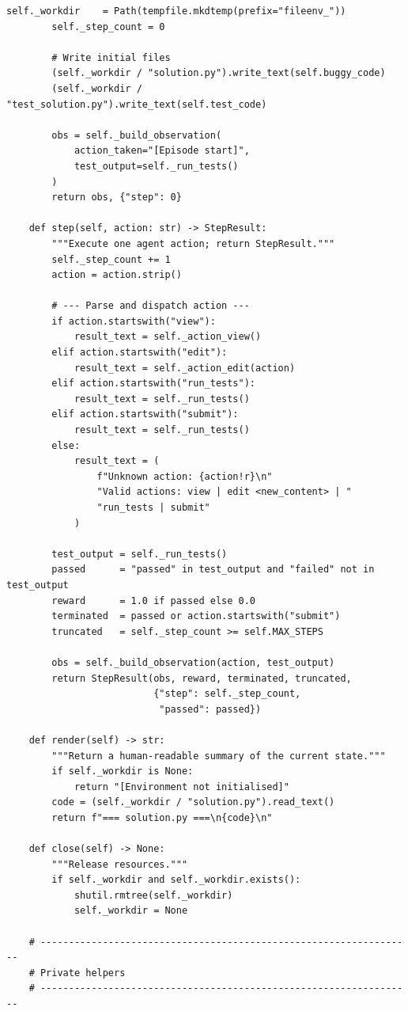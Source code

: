 \begin{lstlisting}[style=pythonstyle, caption={Minimal LLM agent environment following the Gymnasium API.}]
        self._workdir    = Path(tempfile.mkdtemp(prefix="fileenv_"))
        self._step_count = 0

        # Write initial files
        (self._workdir / "solution.py").write_text(self.buggy_code)
        (self._workdir / "test_solution.py").write_text(self.test_code)

        obs = self._build_observation(
            action_taken="[Episode start]",
            test_output=self._run_tests()
        )
        return obs, {"step": 0}

    def step(self, action: str) -> StepResult:
        """Execute one agent action; return StepResult."""
        self._step_count += 1
        action = action.strip()

        # --- Parse and dispatch action ---
        if action.startswith("view"):
            result_text = self._action_view()
        elif action.startswith("edit"):
            result_text = self._action_edit(action)
        elif action.startswith("run_tests"):
            result_text = self._run_tests()
        elif action.startswith("submit"):
            result_text = self._run_tests()
        else:
            result_text = (
                f"Unknown action: {action!r}\n"
                "Valid actions: view | edit <new_content> | "
                "run_tests | submit"
            )

        test_output = self._run_tests()
        passed      = "passed" in test_output and "failed" not in test_output
        reward      = 1.0 if passed else 0.0
        terminated  = passed or action.startswith("submit")
        truncated   = self._step_count >= self.MAX_STEPS

        obs = self._build_observation(action, test_output)
        return StepResult(obs, reward, terminated, truncated,
                          {"step": self._step_count,
                           "passed": passed})

    def render(self) -> str:
        """Return a human-readable summary of the current state."""
        if self._workdir is None:
            return "[Environment not initialised]"
        code = (self._workdir / "solution.py").read_text()
        return f"=== solution.py ===\n{code}\n"

    def close(self) -> None:
        """Release resources."""
        if self._workdir and self._workdir.exists():
            shutil.rmtree(self._workdir)
            self._workdir = None

    # ------------------------------------------------------------------
    # Private helpers
    # ------------------------------------------------------------------


\end{lstlisting}
